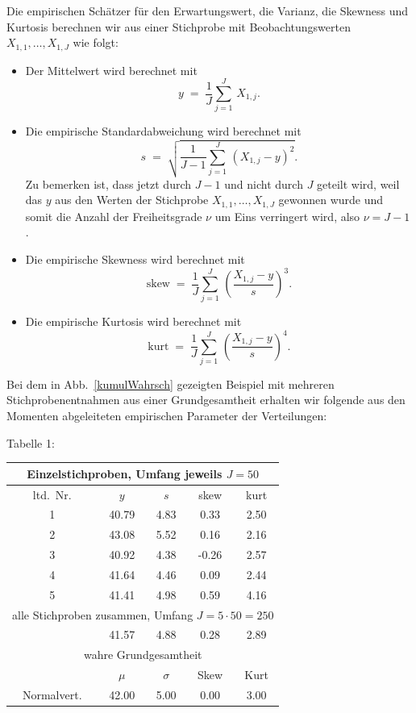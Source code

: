 Die empirischen Schätzer für den Erwartungswert, die Varianz, die Skewness und Kurtosis
berechnen wir aus einer Stichprobe mit Beobachtungswerten $X_{1,1}, \dots, X_{1,J}$
wie folgt:
\begin{itemize}
\item[] Der Mittelwert wird berechnet mit
\begin{equation}
y \; = \; \frac{1}{J}\sum_{j=1}^J \, X_{1,j} .
\end{equation}
\item[] Die empirische Standardabweichung wird berechnet mit
\begin{equation}
s \; = \; \sqrt{ \frac{1}{J-1}\sum_{j=1}^J \, (X_{1,j} - y)^2 }.
\label{empirischeStd}
\end{equation}
Zu bemerken ist, dass jetzt durch $J-1$ und nicht durch $J$ geteilt wird, weil
das $y$ aus den Werten der Stichprobe $X_{1,1}, \dots, X_{1,J}$ gewonnen wurde und somit
die Anzahl der Freiheitsgrade $\nu$ um Eins verringert wird, also $\nu = J-1$.
\item[] 
Die empirische Skewness wird berechnet mit
\begin{equation}
\textrm{skew} \; = \; \frac{1}{J} \sum_{j=1}^J \, \left( \frac{X_{1,j} - y}{s} \right)^3 .
\end{equation}
\item[] Die empirische Kurtosis wird berechnet mit
\begin{equation}
\textrm{kurt} \; = \; \frac{1}{J} \sum_{j=1}^J \, \left( \frac{X_{1,j} - y}{s} \right)^4 .
\end{equation}
\end{itemize}
Bei dem in Abb.~\ref{kumulWahrsch} gezeigten Beispiel mit mehreren Stichprobenentnahmen aus
einer Grundgesamtheit erhalten wir folgende aus den Momenten abgeleiteten empirischen 
Parameter der Verteilungen:
\begin{center}
Tabelle 1:

\begin{tabular}{c||c|c|c|c}
\hline
\multicolumn{5}{c}{Einzelstichproben, Umfang jeweils $J = 50$}\\
\hline
ltd.\ Nr. & $y$ & $s$ & skew & kurt\\
\hline\hline
1 & 40.79 &  4.83 &  0.33 &  2.50 \\
2 & 43.08 &  5.52 &  0.16 &  2.16 \\
3 & 40.92 &  4.38 & -0.26 &  2.57 \\
4 & 41.64 &  4.46 &  0.09 &  2.44 \\
5 & 41.41 &  4.98 &  0.59 &  4.16 \\
\hline\hline
\multicolumn{5}{c}{alle Stichproben zusammen, Umfang $J = 5 \cdot 50 = 250$}\\
\hline
 & 41.57 &  4.88 &  0.28 &  2.89 \\
\hline\hline
\multicolumn{5}{c}{wahre Grundgesamtheit}\\
\hline
 & $\mu$ & $\sigma$ & Skew & Kurt\\
\hline\hline
Normalvert. & 42.00 &  5.00 &  0.00 &  3.00 \\
\hline
\end{tabular}
\end{center}

